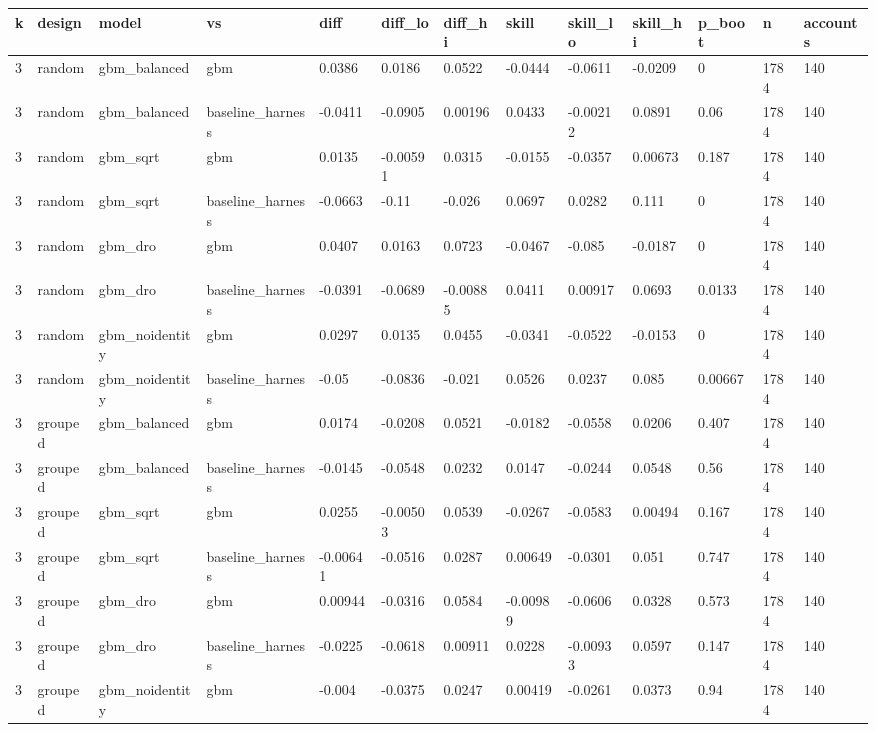 \begin{tabular}{lllllllllllll}
\toprule
k & design & model & vs & diff & diff\_lo & diff\_hi & skill & skill\_lo & skill\_hi & p\_boot & n & accounts \\
\midrule
3 & random & gbm\_balanced & gbm & 0.0386 & 0.0186 & 0.0522 & -0.0444 & -0.0611 & -0.0209 & 0 & 1784 & 140 \\
3 & random & gbm\_balanced & baseline\_harness & -0.0411 & -0.0905 & 0.00196 & 0.0433 & -0.00212 & 0.0891 & 0.06 & 1784 & 140 \\
3 & random & gbm\_sqrt & gbm & 0.0135 & -0.00591 & 0.0315 & -0.0155 & -0.0357 & 0.00673 & 0.187 & 1784 & 140 \\
3 & random & gbm\_sqrt & baseline\_harness & -0.0663 & -0.11 & -0.026 & 0.0697 & 0.0282 & 0.111 & 0 & 1784 & 140 \\
3 & random & gbm\_dro & gbm & 0.0407 & 0.0163 & 0.0723 & -0.0467 & -0.085 & -0.0187 & 0 & 1784 & 140 \\
3 & random & gbm\_dro & baseline\_harness & -0.0391 & -0.0689 & -0.00885 & 0.0411 & 0.00917 & 0.0693 & 0.0133 & 1784 & 140 \\
3 & random & gbm\_noidentity & gbm & 0.0297 & 0.0135 & 0.0455 & -0.0341 & -0.0522 & -0.0153 & 0 & 1784 & 140 \\
3 & random & gbm\_noidentity & baseline\_harness & -0.05 & -0.0836 & -0.021 & 0.0526 & 0.0237 & 0.085 & 0.00667 & 1784 & 140 \\
3 & grouped & gbm\_balanced & gbm & 0.0174 & -0.0208 & 0.0521 & -0.0182 & -0.0558 & 0.0206 & 0.407 & 1784 & 140 \\
3 & grouped & gbm\_balanced & baseline\_harness & -0.0145 & -0.0548 & 0.0232 & 0.0147 & -0.0244 & 0.0548 & 0.56 & 1784 & 140 \\
3 & grouped & gbm\_sqrt & gbm & 0.0255 & -0.00503 & 0.0539 & -0.0267 & -0.0583 & 0.00494 & 0.167 & 1784 & 140 \\
3 & grouped & gbm\_sqrt & baseline\_harness & -0.00641 & -0.0516 & 0.0287 & 0.00649 & -0.0301 & 0.051 & 0.747 & 1784 & 140 \\
3 & grouped & gbm\_dro & gbm & 0.00944 & -0.0316 & 0.0584 & -0.00989 & -0.0606 & 0.0328 & 0.573 & 1784 & 140 \\
3 & grouped & gbm\_dro & baseline\_harness & -0.0225 & -0.0618 & 0.00911 & 0.0228 & -0.00933 & 0.0597 & 0.147 & 1784 & 140 \\
3 & grouped & gbm\_noidentity & gbm & -0.004 & -0.0375 & 0.0247 & 0.00419 & -0.0261 & 0.0373 & 0.94 & 1784 & 140 \\

\end{tabular}

